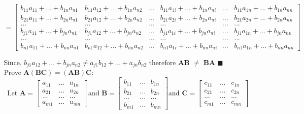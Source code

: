 \documentclass{article}
\newcommand*{\QED}{\hfill\ensuremath{\blacksquare}}
\begin{document}
\begin{enumerate}
		$$= \begin{bmatrix}
		b_{11} a_{11} + ... + b_{1n} a_{n1}  & b_{11} a_{12} + ... + b_{1n} a_{n2} & ... & b_{11} a_{1i} + ... + b_{1n} a_{ni} & ... & b_{11} a_{1n} + ... + b_{1n} a_{nn} \\
		b_{21} a_{11} + ... + b_{2n} a_{n1}  & b_{21} a_{12} + ... + b_{2n} a_{n2} & ... & b_{21} a_{2i} + ... + b_{2n} a_{ni} & ... & b_{21} a_{2n} + ... + b_{2n} a_{nn} \\
		...       &      ...      & ... &      ...      & ... &      ...      \\
		b_{j1} a_{11} + ... + b_{jn} a_{n1}  & b_{j1} a_{12} + ... + b_{jn} a_{n2} & ... & b_{j1} a_{1i} + ... + b_{jn} a_{ni} & ... & b_{j1} a_{1n} + ... + b_{jn} a_{nn} \\
		...       &      ...      & ... &      ...      & ... &      ...      \\
		b_{n1} a_{11} + ... + b_{nn} a_{n1}  & b_{n1} a_{12} + ... + b_{nn} a_{n2} & ... & b_{n1} a_{1i} + ... + b_{nn} a_{ni} & ... & b_{n1} a_{1n} + ... + b_{nn} a_{nn} 
		\end{bmatrix}$$
		
	Since, $b_{j1} a_{12} + ... + b_{jn} a_{n2} \neq a_{j1} b_{12} + ... + a_{jn} b_{n2}$ therefore \textbf{AB} $\neq$ \textbf{BA} \QED \\
	 
	Prove $ \textbf{A}(\textbf{BC}) = (\textbf{AB})\textbf{C} $:
		$$	\text{Let } 
		\textbf{A} = \begin{bmatrix}
		a_{11}  &  ... & a_{1n} \\
		a_{21}  &  ... & a_{2n} \\
		...     &  ... & ...    \\
		a_{m1}  &  ... & a_{mn} 
		\end{bmatrix}  
		\text{and }
		\textbf{B} = \begin{bmatrix}
		b_{11}  &  ... & b_{1n} \\
		b_{21}  &  ... & b_{2n} \\
		...     &  ... & ...    \\
		b_{m1}  &  ... & b_{mn}
		\end{bmatrix}
		\text{and }
		\textbf{C} = \begin{bmatrix}
		c_{11}  &  ... & c_{1n} \\
		c_{21}  &  ... & c_{2n} \\
		...     &  ... & ...    \\
		c_{m1}  &  ... & c_{mn}
		\end{bmatrix}$$
		

\end{enumerate}
\end{document}
